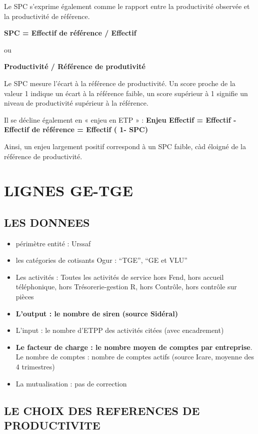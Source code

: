 \documentclass[
]{book}
\begin{document}
Le SPC s'exprime également comme le rapport entre la productivité observée et la productivité de référence.

\textbf{SPC = Effectif de référence / Effectif}

ou

\textbf{Productivité / Référence de produtivité}

Le SPC mesure l'écart à la référence de productivité. Un score proche de la valeur 1 indique un écart à la référence faible, un score supérieur à 1 signifie un niveau de productivité supérieur à la référence.

Il se décline également en « enjeu en ETP » :
\textbf{Enjeu Effectif = Effectif - Effectif de référence = Effectif ( 1- SPC)}

Ainsi, un enjeu largement positif correspond à un SPC faible, càd éloigné de la référence de productivité.

\hypertarget{lignes-ge-tge}{%
\chapter{LIGNES GE-TGE}\label{lignes-ge-tge}}

\hypertarget{les-donnees-5}{%
\section{LES DONNEES}\label{les-donnees-5}}

\begin{itemize}
\item
  périmètre entité : Urssaf
\item
  les catégories de cotisants Ogur : ``TGE'', ``GE et VLU''
\item
  Les activités :
  Toutes les activités de service hors Fend, hors accueil téléphonique, hors Trésorerie-gestion R, hors Contrôle, hors contrôle sur pièces
\item
  \textbf{L'output : le nombre de siren (source Sidéral)}
\item
  L'input : le nombre d'ETPP des activités citées (avec encadrement)
\item
  \textbf{Le facteur de charge : le nombre moyen de comptes par entreprise}.
  Le nombre de comptes : nombre de comptes actifs (source Icare, moyenne des 4 trimestres)
\item
  La mutualisation : pas de correction
\end{itemize}

\hypertarget{le-choix-des-references-de-productivite}{%
\section{LE CHOIX DES REFERENCES DE PRODUCTIVITE}\label{le-choix-des-references-de-productivite}}
\end{document}
